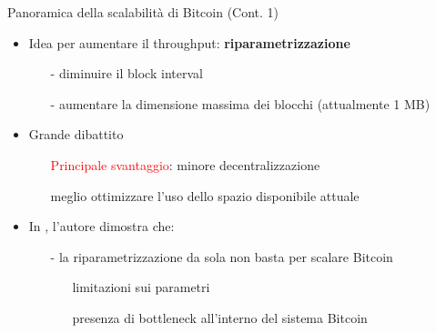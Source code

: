 \documentclass{beamer}
\begin{document}
  \begin{frame}{Panoramica della scalabilità di Bitcoin (Cont. 1)}
      \begin{itemize}
          \item Idea per aumentare il throughput: \textbf{riparametrizzazione}
          \begin{itemize}
              \item[-] diminuire il block interval
              \item[-] aumentare la dimensione massima dei blocchi (attualmente 1 MB)
          \end{itemize}
          \item Grande dibattito 
          \begin{itemize}
              \item[\MVRightarrow] \textcolor{red}{Principale svantaggio}: minore decentralizzazione
              \item[\MVRightarrow] meglio ottimizzare l'uso dello spazio disponibile attuale
          \end{itemize}
          \item In \cite{croman-scaling-blockchain}, l'autore dimostra che: 
          \begin{itemize}
              \item[-] la riparametrizzazione da sola non basta per scalare Bitcoin
              \begin{itemize}
                  \item[\MVRightarrow] limitazioni sui parametri
                  \item[\MVRightarrow] presenza di bottleneck all'interno del sistema Bitcoin
              \end{itemize}
          \end{itemize}
      \end{itemize}
  \end{frame}
  
 
  
  
  
\end{document}

